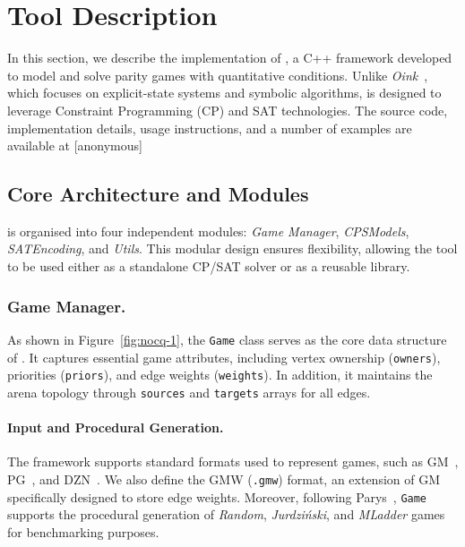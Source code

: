 \documentclass[a4paper,UKenglish,cleveref, autoref, thm-restate, anonymous]{lipics-v2021}
\begin{document}
\section{Tool Description}

In this section, we describe the implementation of \nocq, a C++ framework developed to model and solve parity games with quantitative conditions. Unlike \emph{Oink}~\cite{vanDijk:2018}, which focuses on explicit-state systems and symbolic algorithms, \nocq is designed to leverage Constraint Programming (CP) and SAT technologies. The source code, implementation details, usage instructions, and a number of examples are available at [anonymous]

\subsection*{Core Architecture and Modules}

\nocq is organised into four independent modules: \emph{Game Manager}, \emph{CPSModels}, \emph{SATEncoding}, and \emph{Utils}. This modular design ensures flexibility, allowing the tool to be used either as a standalone CP/SAT solver or as a reusable library.


\subsubsection*{Game Manager.}

As shown in Figure~\ref{fig:nocq-1}, the \texttt{Game} class serves as the core data structure of \nocq. It captures essential game attributes, including vertex ownership (\texttt{owners}), priorities (\texttt{priors}), and edge weights (\texttt{weights}). In addition, it maintains the arena topology through \texttt{sources} and \texttt{targets} arrays for all edges.

\paragraph{Input and Procedural Generation.}
The framework supports standard formats used to represent games, such as GM~\cite{Parys:2019}, PG~\cite{vanDijk:2018}, and DZN~\cite{Minizinc:2020}. We also define the GMW (\texttt{.gmw}) format, an extension of GM specifically designed to store edge weights.
%
Moreover, 
following Parys~\cite{Parys:2019}, \texttt{Game} supports the procedural generation of \emph{Random}, \emph{Jurdziński}, and \emph{MLadder} games for benchmarking purposes.
\end{document}
